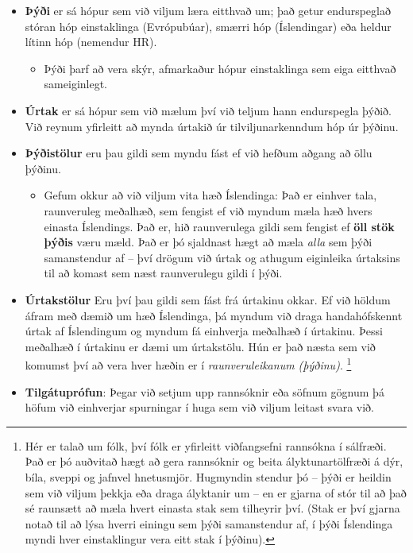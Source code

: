 \documentclass[
]{book}
\providecommand{\tightlist}{%
  \setlength{\itemsep}{0pt}\setlength{\parskip}{0pt}}
\theoremstyle{definition}
\theoremstyle{definition}
\theoremstyle{definition}
\theoremstyle{definition}
\theoremstyle{remark}
\begin{document}
\begin{itemize}
\tightlist
\item
  \textbf{Þýði} er sá hópur sem við viljum læra eitthvað um; það getur
  endurspeglað stóran hóp einstaklinga (Evrópubúar), smærri hóp
  (Íslendingar) eða heldur lítinn hóp (nemendur HR).

  \begin{itemize}
  \tightlist
  \item
    Þýði þarf að vera skýr, afmarkaður hópur einstaklinga sem eiga
    eitthvað sameiginlegt.
  \end{itemize}
\item
  \textbf{Úrtak} er sá hópur sem við mælum því við teljum hann endurspegla
  þýðið. Við reynum yfirleitt að mynda úrtakið úr tilviljunarkenndum
  hóp úr þýðinu.
\item
  \textbf{Þýðistölur} eru þau gildi sem myndu fást ef við hefðum aðgang að
  öllu þýðinu.

  \begin{itemize}
  \tightlist
  \item
    Gefum okkur að við viljum vita hæð Íslendinga: Það er einhver
    tala, raunveruleg meðalhæð, sem fengist ef við myndum mæla hæð
    hvers einasta Íslendings. Það er, hið raunverulega gildi sem
    fengist ef \textbf{öll stök þýðis} væru mæld. Það er þó sjaldnast
    hægt að mæla \emph{alla} sem þýði samanstendur af -- því drögum við
    úrtak og athugum eiginleika úrtaksins til að komast sem næst
    raunverulegu gildi í þýði.
  \end{itemize}
\item
  \textbf{Úrtakstölur} Eru því þau gildi sem fást frá úrtakinu okkar. Ef
  við höldum áfram með dæmið um hæð Íslendinga, þá myndum við draga
  handahófskennt úrtak af Íslendingum og myndum fá einhverja meðalhæð
  í úrtakinu. Þessi meðalhæð í úrtakinu er dæmi um úrtakstölu. Hún er
  það næsta sem við komumst því að vera hver hæðin er í
  \emph{raunveruleikanum (þýðinu)}. \footnote{Hér er talað um fólk, því fólk er yfirleitt viðfangsefni
    rannsókna í sálfræði. Það er þó auðvitað hægt að gera rannsóknir og
    beita ályktunartölfræði á dýr, bíla, sveppi og jafnvel hnetusmjör.
    Hugmyndin stendur þó -- þýði er heildin sem við viljum þekkja eða
    draga ályktanir um -- en er gjarna of stór til að það sé raunsætt að
    mæla hvert einasta stak sem tilheyrir því. (Stak er því gjarna notað
    til að lýsa hverri einingu sem þýði samanstendur af, í þýði
    Íslendinga myndi hver einstaklingur vera eitt stak í þýðinu).}
\item
  \textbf{Tilgátuprófun}: Þegar við setjum upp rannsóknir eða söfnum gögnum
  þá höfum við einhverjar spurningar í huga sem við viljum leitast
  svara við.


\end{itemize}
\end{document}
